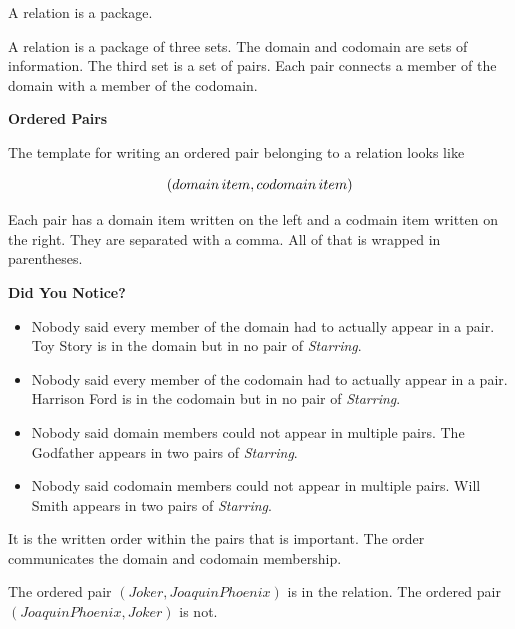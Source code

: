 \documentclass{ximera}
\begin{document}
A relation is a package.  

A relation is a package of three sets. The domain and codomain are sets of information.  The third set is a set of pairs.  Each pair connects a member of the domain with a member of the codomain. 


\begin{template} \textbf{\textcolor{purple!85!blue}{Ordered Pairs}}  

The template for writing an ordered pair belonging to a relation looks like  

\[ \large{( domain \, item, codomain \, item )} \]

Each pair has a domain item written on the left and a codmain item written on the right.  They are separated with a comma.  All of that is wrapped in parentheses.

\end{template}














\newpage



\begin{warning} \textbf{\textcolor{red!80!black}{Did You Notice?}}  
\begin{itemize}
\item Nobody said every member of the domain had to actually appear in a pair.  Toy Story is in the domain but in no pair of \textit{Starring}.
\item Nobody said every member of the codomain had to actually appear in a pair.  Harrison Ford is in the codomain but in no pair of \textit{Starring}.
\item Nobody said domain members could not appear in multiple pairs.  The Godfather appears in two pairs of \textit{Starring}.
\item Nobody said codomain members could not appear in multiple pairs.  Will Smith appears in two pairs of \textit{Starring}.
\end{itemize}
\end{warning}


It is the written order within the pairs that is important. The order communicates the domain and codomain membership.

The ordered pair $(Joker, Joaquin Phoenix)$ is in the relation.  The ordered pair $(Joaquin Phoenix, Joker)$ is not. 
\end{document}
